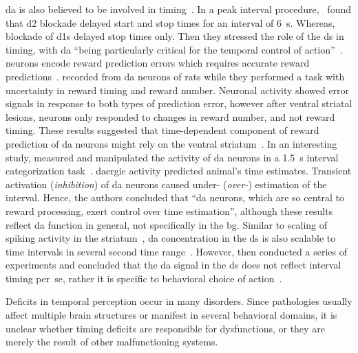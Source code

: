 \Gls{da} is also believed to be involved in timing~\cite{Paton2018NeuronRev}.
In a peak interval procedure,\footnotemark\  found that \gls{d2} blockade delayed start and stop times for an interval of 6~s.
Whereas, blockade of \glspl{d1} delayed stop times only.
Then they stressed the role of the \gls{ds} in timing, with \gls{da} ``being particularly critical for the temporal control of action''~\cite{DeCorte2019}.
 neurons encode reward prediction errors which requires accurate reward predictions~\cite[see][]{Berke2018NN}.
 recorded from \gls{da} neurons of rats while they performed a task with uncertainty in reward timing and reward number.
Neuronal activity showed error signals in response to both types of prediction error, however after ventral striatal lesions, neurons only responded to changes in reward number, and not reward timing.
These results suggested that time-dependent component of reward prediction of \gls{da} neurons might rely on the ventral striatum~\cite{Takahashi2016}.
In an interesting study,  measured and manipulated the activity of \gls{da} neurons in a 1.5~s interval categorization task~\cite{Paton2016Sci}.
\Gls{da}ergic activity predicted animal's time estimates.
Transient activation (\textit{inhibition}) of \gls{da} neurons caused under- (\textit{over-}) estimation of the interval.
Hence, the authors concluded that ``\gls{da} neurons, which are so central to reward processing, exert control over time estimation'', although these results reflect \gls{da} function in general, not specifically in the \gls{bg}.
Similar to scaling of spiking activity in the striatum~\cite{Mello2015}, \gls{da} concentration in the \gls{ds} is also scalable to time intervals in several second time range~\cite{Howard2017}.
However, \citeauthor{Howard2017} then conducted a series of experiments and concluded that the \gls{da} signal in the \gls{ds} does not reflect interval timing per~se, rather it is specific to behavioral choice of action~\cite{Howard2017}.
\par
Deficits in temporal perception occur in many disorders.
Since pathologies usually affect multiple brain structures or manifest in several behavioral domains, it is unclear whether timing deficits are responsible for dysfunctions, or they are merely the result of other malfunctioning systems.

